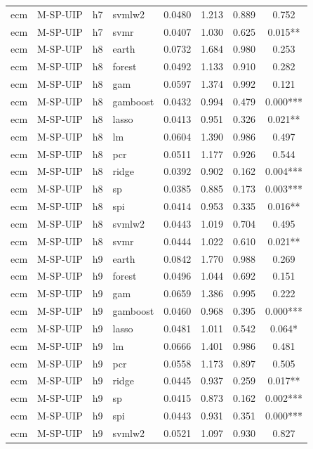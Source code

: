 \begin{ThreePartTable}
\begin{longtable}[t]{llclcccc}
ecm & M-SP-UIP & h7 & svmlw2 & 0.0480 & 1.213 & 0.889 & 0.752\\
ecm & M-SP-UIP & h7 & svmr & 0.0407 & 1.030 & 0.625 & 0.015**\\
\addlinespace
ecm & M-SP-UIP & h8 & earth & 0.0732 & 1.684 & 0.980 & 0.253\\
ecm & M-SP-UIP & h8 & forest & 0.0492 & 1.133 & 0.910 & 0.282\\
ecm & M-SP-UIP & h8 & gam & 0.0597 & 1.374 & 0.992 & 0.121\\
ecm & M-SP-UIP & h8 & gamboost & 0.0432 & 0.994 & 0.479 & 0.000***\\
ecm & M-SP-UIP & h8 & lasso & 0.0413 & 0.951 & 0.326 & 0.021**\\
ecm & M-SP-UIP & h8 & lm & 0.0604 & 1.390 & 0.986 & 0.497\\
ecm & M-SP-UIP & h8 & pcr & 0.0511 & 1.177 & 0.926 & 0.544\\
ecm & M-SP-UIP & h8 & ridge & 0.0392 & 0.902 & 0.162 & 0.004***\\
ecm & M-SP-UIP & h8 & sp & 0.0385 & 0.885 & 0.173 & 0.003***\\
ecm & M-SP-UIP & h8 & spi & 0.0414 & 0.953 & 0.335 & 0.016**\\
ecm & M-SP-UIP & h8 & svmlw2 & 0.0443 & 1.019 & 0.704 & 0.495\\
ecm & M-SP-UIP & h8 & svmr & 0.0444 & 1.022 & 0.610 & 0.021**\\
\addlinespace
ecm & M-SP-UIP & h9 & earth & 0.0842 & 1.770 & 0.988 & 0.269\\
ecm & M-SP-UIP & h9 & forest & 0.0496 & 1.044 & 0.692 & 0.151\\
ecm & M-SP-UIP & h9 & gam & 0.0659 & 1.386 & 0.995 & 0.222\\
ecm & M-SP-UIP & h9 & gamboost & 0.0460 & 0.968 & 0.395 & 0.000***\\
ecm & M-SP-UIP & h9 & lasso & 0.0481 & 1.011 & 0.542 & 0.064*\\
ecm & M-SP-UIP & h9 & lm & 0.0666 & 1.401 & 0.986 & 0.481\\
ecm & M-SP-UIP & h9 & pcr & 0.0558 & 1.173 & 0.897 & 0.505\\
ecm & M-SP-UIP & h9 & ridge & 0.0445 & 0.937 & 0.259 & 0.017**\\
ecm & M-SP-UIP & h9 & sp & 0.0415 & 0.873 & 0.162 & 0.002***\\
ecm & M-SP-UIP & h9 & spi & 0.0443 & 0.931 & 0.351 & 0.000***\\
ecm & M-SP-UIP & h9 & svmlw2 & 0.0521 & 1.097 & 0.930 & 0.827\\

\end{longtable}
\end{ThreePartTable}
